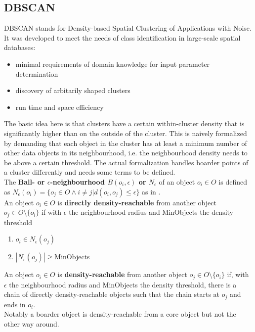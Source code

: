 \subsection{DBSCAN}\label{\positionnumber}
DBSCAN\cite{dbscan} stands for Density-based Spatial Clustering of Applications with Noise. It was developed to meet the needs of class identification in large-scale spatial databases:
\begin{itemize}
    \item minimal requirements of domain knowledge for input parameter determination
    \item discovery of arbitarily shaped clusters
    \item run time and space efficiency
\end{itemize}
The basic idea here is that clusters have a certain within-cluster density that is significantly higher than on the outside of the cluster. This is naively formalized by demanding that each object in the cluster has at least a minimum number of other data objects in its neighbourhood, i.e. the neighbourhood density needs to be above a certain threshold. The actual formalization handles boarder points of a cluster differently and needs some terms to be defined. \\

The \textbf{Ball- or $\epsilon$-neighbourhood $B(o_i, \epsilon)$ or $N_\epsilon$} of an object $o_i \in O$ is defined as $N_\epsilon(o_i) = \{o_j \in O \wedge i \neq j | d(o_i, o_j) \leq \epsilon \}$ as in . \\

An object $o_i \in O$ is \textbf{directly density-reachable} from another object $o_j \in O\setminus \{o_i\}$ if with $\epsilon$ the neighbourhood radius and MinObjects the density threshold
\begin{enumerate}
    \item $o_i \in N_\epsilon (o_j)$
    \item $|N_\epsilon(o_j)| \geq $MinObjects
\end{enumerate}

An object $o_i \in O$ is \textbf{density-reachable} from another object $o_j \in O\setminus \{o_i\}$ if, with $\epsilon$ the neighbourhood radius and MinObjects the density threshold, there is a chain of directly density-reachable objects such that the chain starts at $o_j$ and ends in $o_i$. \\
Notably a boarder object is density-reachable from a core object but not the other way around. \\

